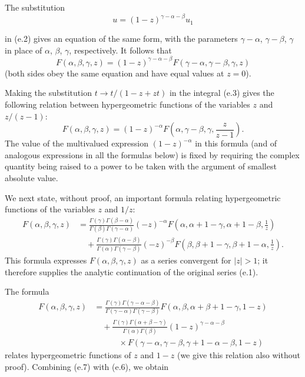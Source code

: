 The substitution
\[
 u=(1-z)^{\gamma-\alpha-\beta}u_1
\]

in (e.2) gives an equation of the same form, with the parameters
$\gamma-\alpha$, $\gamma-\beta$, $\gamma$ in place of $\alpha$, $\beta$,
$\gamma$, respectively. It follows that
\begin{equation}
 F(\alpha,\beta,\gamma,z)=(1-z)^{\gamma-\alpha-\beta}
 F(\gamma-\alpha,\gamma-\beta,\gamma,z)
 \tag{e.4}
\end{equation}
(both sides obey the same equation and have equal values at $z=0$).

Making the substitution $t\to t/(1-z+zt)$ in the integral (e.3) gives the
following relation between hypergeometric functions of the variables $z$ and
$z/(z-1)$:
\begin{equation}
 F(\alpha,\beta,\gamma,z)=(1-z)^{-\alpha}
 F\left(\alpha,\gamma-\beta,\gamma,\frac z{z-1}\right).
 \tag{e.5}
\end{equation}
The value of the multivalued expression $(1-z)^{-\alpha}$ in this formula (and
of analogous expressions in all the formulas below) is fixed by requiring the
complex quantity being raised to a power to be taken with the argument of
smallest absolute value.

We next state, without proof, an important formula relating hypergeometric
functions of the variables $z$ and $1/z$:
\begin{equation}
 \begin{split}
 F(\alpha,\beta,\gamma,z)
 &=\frac{\Gamma(\gamma)\Gamma(\beta-\alpha)}
 {\Gamma(\beta)\Gamma(\gamma-\alpha)}(-z)^{-\alpha}
 F\left(\alpha,\alpha+1-\gamma,\alpha+1-\beta,\frac1z\right)\\
 &\hspace{1em}+\frac{\Gamma(\gamma)\Gamma(\alpha-\beta)}
 {\Gamma(\alpha)\Gamma(\gamma-\beta)}(-z)^{-\beta}
 F\left(\beta,\beta+1-\gamma,\beta+1-\alpha,\frac1z\right).
 \end{split}
 \tag{e.6}
\end{equation}
This formula expresses $F(\alpha,\beta,\gamma,z)$ as a series convergent for
$|z|>1$; it therefore supplies the analytic continuation of the original
series (e.1).

The formula
\begin{equation}
 \begin{split}
 F(\alpha,\beta,\gamma,z)
 &=\frac{\Gamma(\gamma)\Gamma(\gamma-\alpha-\beta)}
 {\Gamma(\gamma-\alpha)\Gamma(\gamma-\beta)}
 F(\alpha,\beta,\alpha+\beta+1-\gamma,1-z)\\
 &\hspace{1em}+\frac{\Gamma(\gamma)\Gamma(\alpha+\beta-\gamma)}
 {\Gamma(\alpha)\Gamma(\beta)}(1-z)^{\gamma-\alpha-\beta}\\
 &\hspace{3em}\times
 F(\gamma-\alpha,\gamma-\beta,\gamma+1-\alpha-\beta,1-z)
 \end{split}
 \tag{e.7}
\end{equation}
relates hypergeometric functions of $z$ and $1-z$ (we give this relation also
without proof). Combining (e.7) with (e.6), we obtain

